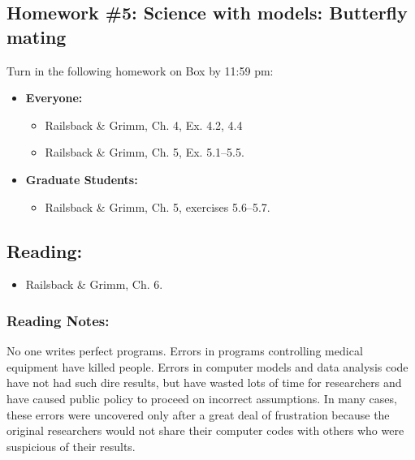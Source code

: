\documentclass[]{article}
\providecommand{\tightlist}{%
  \setlength{\itemsep}{0pt}\setlength{\parskip}{0pt}}
\begin{document}
\hypertarget{homework-5-science-with-models-butterfly-mating}{%
\subsection{Homework \#5: Science with models: Butterfly
mating}\label{homework-5-science-with-models-butterfly-mating}}

Turn in the following homework on Box by 11:59 pm:

\begin{itemize}
\tightlist
\item
  \textbf{Everyone:}

  \begin{itemize}
  \tightlist
  \item
    Railsback \& Grimm, Ch. 4, Ex. 4.2, 4.4
  \item
    Railsback \& Grimm, Ch. 5, Ex. 5.1--5.5.
  \end{itemize}
\item
  \textbf{Graduate Students:}

  \begin{itemize}
  \tightlist
  \item
    Railsback \& Grimm, Ch. 5, exercises 5.6--5.7.
  \end{itemize}
\end{itemize}

\hypertarget{reading-6}{%
\subsection{Reading:}\label{reading-6}}

\begin{itemize}
\tightlist
\item
  Railsback \& Grimm, Ch. 6.
\end{itemize}

\hypertarget{reading-notes-5}{%
\subsubsection{Reading Notes:}\label{reading-notes-5}}

No one writes perfect programs. Errors in programs controlling medical
equipment have killed people. Errors in computer models and data
analysis code have not had such dire results, but have wasted lots of
time for researchers and have caused public policy to proceed on
incorrect assumptions. In many cases, these errors were uncovered only
after a great deal of frustration because the original researchers would
not share their computer codes with others who were suspicious of their
results.
\end{document}
